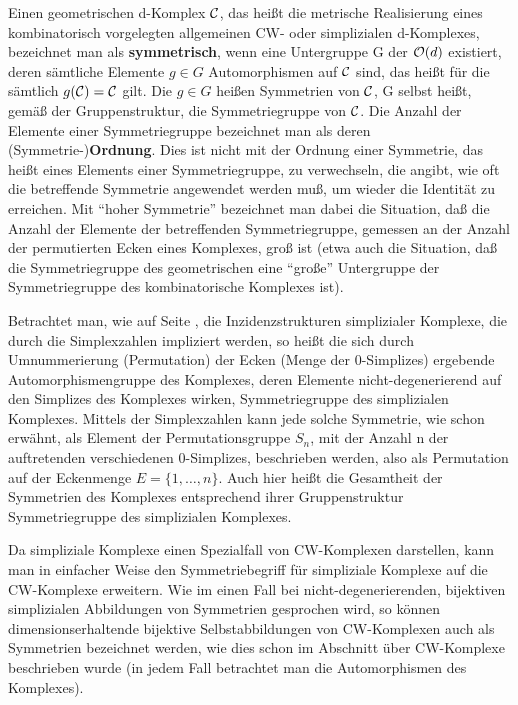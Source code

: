 Einen geometrischen d-Komplex $\cal C$, das heißt die metrische Realisierung
eines kombinatorisch vorgelegten allgemeinen CW- oder simplizialen d-Komplexes,
bezeichnet man als {\bf symmetrisch},
wenn eine Untergruppe G der ${\cal O}(d)$ existiert, deren sämtliche
Elemente $g\in G$ Automorphismen auf $\cal C$ sind, das heißt für die
sämtlich $g({\cal C}) = {\cal C}$ gilt. Die $g\in G$ heißen Symmetrien
von $\cal C$, G selbst heißt, gemäß der Gruppenstruktur, die Symmetriegruppe
 von $\cal C$.
Die Anzahl der Elemente einer Symmetriegruppe bezeichnet man als deren
(Symmetrie-){\bf Ordnung}. Dies ist nicht mit der Ordnung einer Symmetrie, das
heißt eines Elements einer Symmetriegruppe, zu verwechseln, die angibt, wie oft
die betreffende Symmetrie angewendet werden muß, um wieder die Identität zu
erreichen. Mit "`hoher Symmetrie"' bezeichnet man dabei die Situation, daß
die Anzahl der Elemente der betreffenden Symmetriegruppe, gemessen an
der Anzahl der permutierten Ecken eines Komplexes, groß ist
 (etwa auch die Situation, daß die Symmetriegruppe des
geometrischen eine "`große"' Untergruppe der Symmetriegruppe des kombinatorische
Komplexes ist).

Betrachtet man, wie auf Seite \pageref{symm}, die Inzidenzstrukturen
simplizialer Komplexe, die durch die Simplexzahlen impliziert werden, so
heißt die sich durch Umnummerierung (Permutation) der Ecken (Menge der
0-Simplizes) ergebende Automorphismengruppe des Komplexes, deren Elemente
nicht-degenerierend auf den Simplizes des Komplexes wirken, Symmetriegruppe
des simplizialen Komplexes.
Mittels der Simplexzahlen kann jede solche Symmetrie, wie schon erwähnt,
als Element der Permutationsgruppe $S_n$, mit der Anzahl n der auftretenden
verschiedenen 0-Simplizes, beschrieben werden, also als Permutation auf der
Eckenmenge $E=\{1,\ldots,n\}$. Auch hier heißt die Gesamtheit der Symmetrien
des Komplexes entsprechend ihrer Gruppenstruktur Symmetriegruppe des
simplizialen Komplexes.

Da simpliziale Komplexe einen Spezialfall von CW-Komplexen darstellen, kann
man in einfacher Weise den Symmetriebegriff für simpliziale Komplexe
auf die CW-Komplexe erweitern. Wie im einen Fall bei nicht-degenerierenden,
bijektiven simplizialen Abbildungen von Symmetrien gesprochen wird, so können
dimensionserhaltende bijektive Selbstabbildungen von CW-Komplexen auch als
Symmetrien bezeichnet werden, wie dies schon im Abschnitt über CW-Komplexe
beschrieben wurde (in jedem Fall betrachtet man die Automorphismen des
Komplexes).

